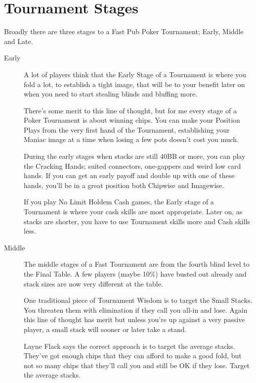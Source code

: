 \chapter{Tournament Stages}


Broadly there are three stages to a Fast Pub Poker Tournament;
Early, Middle and Late.

\begin{description}

\item[Early] A lot of players think that the Early Stage of a
Tournament is where you fold a lot, to establish a tight image,
that will be to your benefit later on when you need to start
stealing blinds and bluffing more.

There's some merit to this line of thought, but for me every stage
of a Poker Tournament is about winning chips. You can make
your Position Plays from the very first hand of the Tournament,
establishing your Maniac image at a time when losing a few pots
doesn't cost you much.

During the early stages when stacks are still 40BB or more, you can
play the Cracking Hands; suited connectors, one-gappers and weird
low card hands. If you can get an early payoff and double up with
one of these hands, you'll be in a great position both
Chipwise and Imagewise.

If you play No Limit Holdem Cash games, the Early stage of a Tournament
is where your cash skills are most appropriate. Later on, as stacks
are shorter, you have to use Tournament skills more and Cash skills less.

\item[Middle] The middle stages of a Fast Tournament are from the
fourth blind level to the Final Table. A few players (maybe 10\%)
have busted out already and stack sizes are now very different
at the table.

One traditional piece of Tournament Wisdom is to target the Small Stacks.
You threaten them with elimination if they call you all-in and lose.
Again this line of thought has merit but unless you're up against
a very passive player, a small stack will sooner or later take a stand.

Layne Flack says the correct approach is to target the average stacks.
They've got enough chips that they can afford to make a good fold,
but not so many chips that they'll call you and still be OK if they lose.
Target the average stacks.


\end{description}
